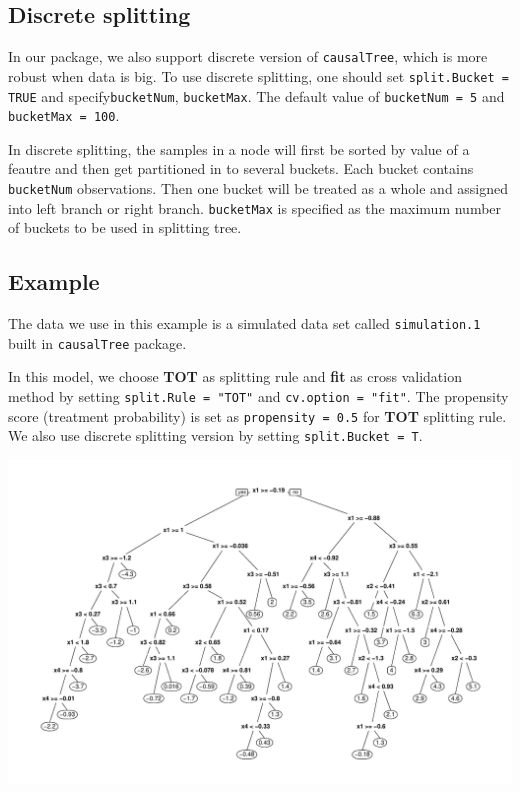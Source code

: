 \documentclass[11pt]{article}
\renewenvironment{Schunk}{\vspace{\topsep}}{\vspace{\topsep}}
\begin{document}
\subsection{Discrete splitting}
In our package, we also support discrete version of \texttt{causalTree}, which is more robust when data is big. To use discrete splitting, one should set \texttt{split.Bucket = TRUE} and specify\texttt{bucketNum}, \texttt{bucketMax}. The default value of \texttt{bucketNum = 5} and \texttt{bucketMax = 100}.\par
In discrete splitting, the samples in a node will first be sorted by value of a feautre and then get partitioned in to several buckets. Each bucket contains \texttt{bucketNum} observations. Then one bucket will be treated as a whole and assigned into left branch or right branch. \texttt{bucketMax} is specified as the maximum number of buckets to be used in splitting tree.

\subsection{Example}
The data we use in this example is a simulated data set called \texttt{simulation.1} built in \texttt{causalTree} package. \par
In this model, we choose \textbf{TOT} as splitting rule and \textbf{fit} as cross validation method by setting \texttt{split.Rule = "TOT"} and \texttt{cv.option = "fit"}. The propensity score (treatment probability) is set as \texttt{propensity = 0.5} for \textbf{TOT} splitting rule. We also use discrete splitting version by setting \texttt{split.Bucket = T}.
\begin{Schunk}
\end{Schunk}
\includegraphics{briefintro-example1}
\end{document}

